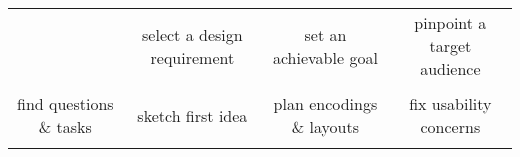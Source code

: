 {\begin{spacing}{1.0}
\begin{longtable}[]{cccc}
\begin{minipage}[t]{0.21\columnwidth}
\end{minipage} & \begin{minipage}[t]{0.21\columnwidth}\raggedright\strut
select a design requirement\strut
\end{minipage} & \begin{minipage}[t]{0.21\columnwidth}\raggedright\strut
set an achievable goal\strut
\end{minipage} & \begin{minipage}[t]{0.21\columnwidth}\raggedright\strut
pinpoint a target audience\strut
\end{minipage}\tabularnewline
\begin{minipage}[t]{0.21\columnwidth}\raggedright\strut
\strut
\end{minipage} & \begin{minipage}[t]{0.21\columnwidth}\raggedright\strut
\strut
\end{minipage} & \begin{minipage}[t]{0.21\columnwidth}\raggedright\strut
\strut
\end{minipage} & \begin{minipage}[t]{0.21\columnwidth}\raggedright\strut
\strut
\end{minipage}\tabularnewline
\begin{minipage}[t]{0.21\columnwidth}\raggedright\strut
find questions \& tasks\strut
\end{minipage} & \begin{minipage}[t]{0.21\columnwidth}\raggedright\strut
sketch first idea\strut
\end{minipage} & \begin{minipage}[t]{0.21\columnwidth}\raggedright\strut
plan encodings \& layouts\strut
\end{minipage} & \begin{minipage}[t]{0.21\columnwidth}\raggedright\strut
fix usability concerns\strut
\end{minipage}\tabularnewline
\begin{minipage}[t]{0.21\columnwidth}\raggedright\strut
\strut
\end{minipage} & \begin{minipage}[t]{0.21\columnwidth}\raggedright\strut
\strut
\end{minipage} & \begin{minipage}[t]{0.21\columnwidth}\raggedright\strut
\strut
\end{minipage} & \begin{minipage}[t]{0.21\columnwidth}\raggedright\strut
\strut

\end{minipage}
\end{longtable}
\end{spacing}}
